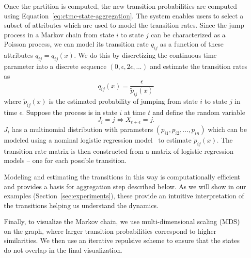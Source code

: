 

Once the partition is computed, the new transition probabilities are computed using Equation~\ref{eq:ctmc-state-aggregation}.
%
The system enables users to select a subset of attributes which are used to model the transition rates. Since the
jump process in a Markov chain from state $i$ to state $j$ can be characterized as a Poisson process, we can model its
transition rate $q_{ij}$ as a function of these attributes $q_{ij} = q_{ij}(x)$. We do this by discretizing the continuous time parameter into a discrete sequence $(0, \epsilon, 2\epsilon, ...)$ and
estimate the transition rates as
\begin{equation}
	q_{ij}(x) = \frac{\epsilon}{\tilde{p}_{ij}(x)}
\end{equation}
where $\tilde{p}_{ij}(x)$ is the estimated probability of jumping from state $i$ to state $j$ in time
$\epsilon$.
%
Suppose the process is in state $i$ at time $t$ and define the random variable 
$$J_i = j \Leftrightarrow X_{t + \epsilon} = j.$$
$J_i$  has a multinomial distribution with parameters $(p_{i1}, p_{i2}, ..., p_{in})$ which can be 
modeled using a nominal logistic regression model~\cite{glm-introduction} to estimate $\tilde{p}_{ij}(x)$.
The transition rate matrix is then constructed from a matrix of logistic regression models -- one for each possible transition. 

Modeling and estimating the transitions in this way is computationally efficient and provides a basis for aggregation step described below. As we will show in our examples (Section~\ref{sec:experiments}), these provide an intuitive interpretation of the transitions helping us understand the dynamics. 	

Finally, to visualize the Markov chain, we use multi-dimensional scaling (MDS) \cite{} on the graph, where larger transition probabilities correspond to higher similarities. We then use an iterative repulsive scheme to ensure that the states do not overlap in the final visualization. 

